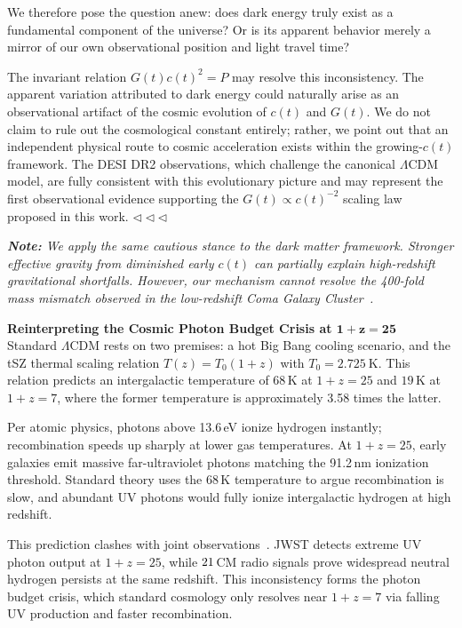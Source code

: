\documentclass[12pt,leqno]{article}
\newcommand{\tinysp}{\mspace{1.5mu}}
\begin{document}
{	We therefore pose the question anew: does dark energy truly exist as a fundamental component of the universe? Or is its apparent behavior merely a mirror of our own observational position and light travel time?
	
	\medskip
	The invariant relation $G(t)c(t)^2=P$ may resolve this inconsistency. The apparent variation attributed to dark energy could naturally arise as an observational artifact of the cosmic evolution of $c(t)$ and $G(t)$. We do not claim to rule out the cosmological constant entirely; rather, we point out that an independent physical route to cosmic acceleration exists within the growing-$c(t)$ framework. The DESI DR2 observations, which challenge the canonical $\Lambda$CDM model, are fully consistent with this evolutionary picture and may represent the first observational evidence supporting the $G(t) \propto c(t)^{-2}$ scaling law proposed in this work.
	\enspace$\triangleleft \triangleleft \triangleleft$
	

	\medskip
	\textit{\textbf{Note:} We apply the same cautious stance to the dark matter framework. Stronger effective gravity from diminished early $c(t)$ can partially explain high-redshift gravitational shortfalls. However, our mechanism cannot resolve the 400-fold mass mismatch observed in the low-redshift Coma Galaxy Cluster~\cite{Zwicky:1933}.}

	
	\medskip
	\bigskip
	\textbf{Reinterpreting the Cosmic Photon Budget Crisis at $\boldsymbol{1+z=25}$}\,\,\,
	Standard $\Lambda$CDM rests on two premises: a hot Big Bang cooling scenario, and the tSZ thermal scaling relation $T(z)=T_0(1+z)$ with $T_0=2.725\ \mathrm{K}$. This relation predicts an intergalactic temperature of $68\,\mathrm{K}$ at $1+z=25$ and $19\,\mathrm{K}$ at $1+z=7$, where the former temperature is approximately 3.58 times the latter.
	
	\medskip
	Per atomic physics, photons above 13.6\,eV ionize hydrogen instantly; recombination speeds up sharply at lower gas temperatures. At $1+z=25$, early galaxies emit massive far-ultraviolet photons matching the 91.2\,nm ionization threshold. Standard theory uses the $68\,\mathrm{K}$ temperature to argue recombination is slow, and abundant UV photons would fully ionize intergalactic hydrogen at high redshift.
	
	\medskip
	This prediction clashes with joint observations~\cite{Madau:2023}. JWST detects extreme UV photon output at $1+z=25$, while $21\tinysp$CM radio signals prove widespread neutral hydrogen persists at the same redshift. This inconsistency forms the photon budget crisis, which standard cosmology only resolves near $1+z=7$ via falling UV production and faster recombination. 
	
}
\end{document}
